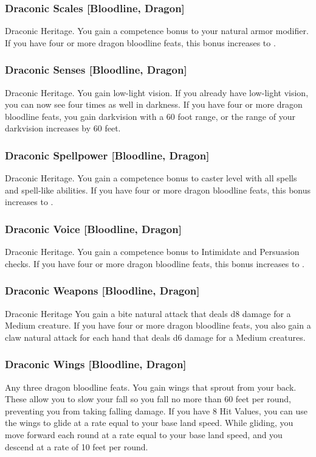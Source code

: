 \subsubsection{Draconic Scales [Bloodline, Dragon]}
 Draconic Heritage.
 You gain a  competence bonus to your natural armor modifier. If you have four or more dragon bloodline feats, this bonus increases to .

\subsubsection{Draconic Senses [Bloodline, Dragon]}
 Draconic Heritage.
 You gain low-light vision. If you already have low-light vision, you can now see four times as well in darkness. If you have four or more dragon bloodline feats, you gain darkvision with a 60 foot range, or the range of your darkvision increases by 60 feet.

\subsubsection{Draconic Spellpower [Bloodline, Dragon]}
 Draconic Heritage.
 You gain a  competence bonus to caster level with all spells and spell-like abilities. If you have four or more dragon bloodline feats, this bonus increases to .

\subsubsection{Draconic Voice [Bloodline, Dragon]}
 Draconic Heritage.
 You gain a  competence bonus to Intimidate and Persuasion checks. If you have four or more dragon bloodline feats, this bonus increases to .

\subsubsection{Draconic Weapons [Bloodline, Dragon]}
 Draconic Heritage
 You gain a bite natural attack that deals d8 damage for a Medium creature. If you have four or more dragon bloodline feats, you also gain a claw natural attack for each hand that deals d6 damage for a Medium creatures.

\subsubsection{Draconic Wings [Bloodline, Dragon]}
 Any three dragon bloodline feats.
 You gain wings that sprout from your back. These allow you to slow your fall so you fall no more than 60 feet per round, preventing you from taking falling damage. If you have 8 Hit Values, you can use the wings to glide at a rate equal to your base land speed. While gliding, you move forward each round at a rate equal to your base land speed, and you descend at a rate of 10 feet per round.

